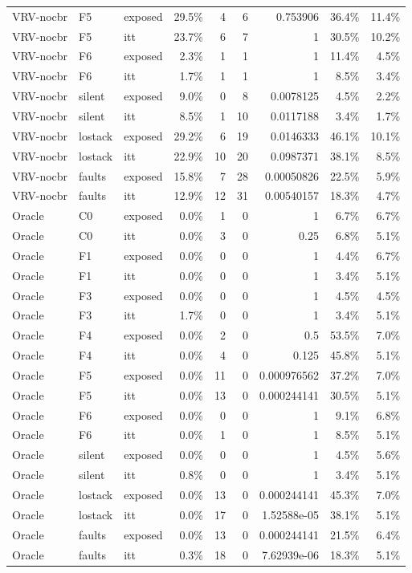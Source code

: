 \begin{tabular}{lllrrrrrr}
VRV-nocbr & F5 & exposed & 29.5\% & 4 & 6 & 0.753906 & 36.4\% & 11.4\% \\
VRV-nocbr & F5 & itt & 23.7\% & 6 & 7 & 1 & 30.5\% & 10.2\% \\
VRV-nocbr & F6 & exposed & 2.3\% & 1 & 1 & 1 & 11.4\% & 4.5\% \\
VRV-nocbr & F6 & itt & 1.7\% & 1 & 1 & 1 & 8.5\% & 3.4\% \\
VRV-nocbr & silent & exposed & 9.0\% & 0 & 8 & 0.0078125 & 4.5\% & 2.2\% \\
VRV-nocbr & silent & itt & 8.5\% & 1 & 10 & 0.0117188 & 3.4\% & 1.7\% \\
VRV-nocbr & lostack & exposed & 29.2\% & 6 & 19 & 0.0146333 & 46.1\% & 10.1\% \\
VRV-nocbr & lostack & itt & 22.9\% & 10 & 20 & 0.0987371 & 38.1\% & 8.5\% \\
VRV-nocbr & faults & exposed & 15.8\% & 7 & 28 & 0.00050826 & 22.5\% & 5.9\% \\
VRV-nocbr & faults & itt & 12.9\% & 12 & 31 & 0.00540157 & 18.3\% & 4.7\% \\
Oracle & C0 & exposed & 0.0\% & 1 & 0 & 1 & 6.7\% & 6.7\% \\
Oracle & C0 & itt & 0.0\% & 3 & 0 & 0.25 & 6.8\% & 5.1\% \\
Oracle & F1 & exposed & 0.0\% & 0 & 0 & 1 & 4.4\% & 6.7\% \\
Oracle & F1 & itt & 0.0\% & 0 & 0 & 1 & 3.4\% & 5.1\% \\
Oracle & F3 & exposed & 0.0\% & 0 & 0 & 1 & 4.5\% & 4.5\% \\
Oracle & F3 & itt & 1.7\% & 0 & 0 & 1 & 3.4\% & 5.1\% \\
Oracle & F4 & exposed & 0.0\% & 2 & 0 & 0.5 & 53.5\% & 7.0\% \\
Oracle & F4 & itt & 0.0\% & 4 & 0 & 0.125 & 45.8\% & 5.1\% \\
Oracle & F5 & exposed & 0.0\% & 11 & 0 & 0.000976562 & 37.2\% & 7.0\% \\
Oracle & F5 & itt & 0.0\% & 13 & 0 & 0.000244141 & 30.5\% & 5.1\% \\
Oracle & F6 & exposed & 0.0\% & 0 & 0 & 1 & 9.1\% & 6.8\% \\
Oracle & F6 & itt & 0.0\% & 1 & 0 & 1 & 8.5\% & 5.1\% \\
Oracle & silent & exposed & 0.0\% & 0 & 0 & 1 & 4.5\% & 5.6\% \\
Oracle & silent & itt & 0.8\% & 0 & 0 & 1 & 3.4\% & 5.1\% \\
Oracle & lostack & exposed & 0.0\% & 13 & 0 & 0.000244141 & 45.3\% & 7.0\% \\
Oracle & lostack & itt & 0.0\% & 17 & 0 & 1.52588e-05 & 38.1\% & 5.1\% \\
Oracle & faults & exposed & 0.0\% & 13 & 0 & 0.000244141 & 21.5\% & 6.4\% \\
Oracle & faults & itt & 0.3\% & 18 & 0 & 7.62939e-06 & 18.3\% & 5.1\% \\
\bottomrule
\end{tabular}

